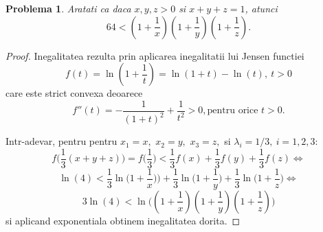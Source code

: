 \documentclass[a4paper,12pt,oneside]{report}
\newtheorem{problem}{Problema}
\begin{document}
\begin{problem}
Aratati ca daca \(x , y , z > 0\) si \(x+ y + z = 1\), atunci
\begin{displaymath}
  64 < \left ( 1 + \frac{1}{x} \right )\left ( 1 + \frac{1}{y} \right )\left ( 1 + \frac{1}{z} \right ).
\end{displaymath}
\end{problem}
\begin{proof}
Inegalitatea rezulta prin aplicarea inegalitatii lui Jensen functiei
\begin{displaymath}
  f\left ( t \right ) = \ln \left ( 1+\frac{1}{t} \right ) = \ln \left ( 1 + t \right ) - \ln \left ( t \right ),~t>0
\end{displaymath}
care este strict convexa deoarece
\begin{displaymath}
  {f}''\left ( t \right ) = -\frac{1}{\left ( 1 + t \right )^{2}} + \frac{1}{t^{2}} > 0,  \text{pentru orice } t > 0.
\end{displaymath}

Intr-adevar, pentru pentru $x_1=x,$ $x_2=y,$ $x_3=z,$ si $\lambda_i=1/3,~i=1, 2, 3:$
\[
f\biggl(\frac{1}{3}(x+y+z)\biggr)=f\biggl(\frac{1}{3}\biggr)<\frac{1}{3}f(x)+\frac{1}{3}f(y)+\frac{1}{3}f(z)\Leftrightarrow
\]
\[
\ln (4)<\frac{1}{3}\ln\biggl(1+\frac{1}{x})\biggr) +\frac{1}{3}\ln\biggl(1+\frac{1}{y}\biggr)+\frac{1}{3}\ln\biggl(1+\frac{1}{z}\biggr)\Leftrightarrow
\]
\[
3\ln (4)< \ln\biggl((1+\frac{1}{x})(1+\frac{1}{y})(1+\frac{1}{z})\biggr)
\]
si aplicand exponentiala obtinem inegalitatea dorita.
\end{proof}
\end{document}
